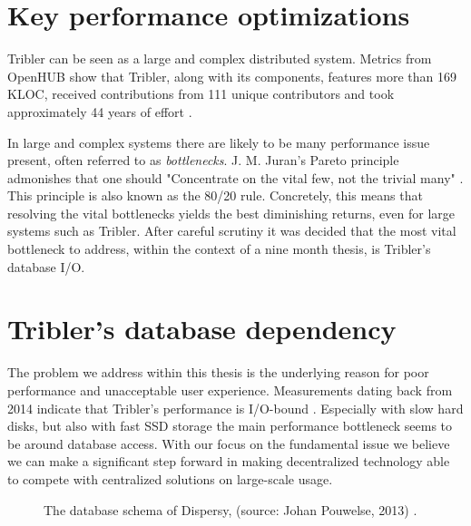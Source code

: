 \section{Key performance optimizations}

Tribler can be seen as a large and complex distributed system.
Metrics from OpenHUB show that Tribler, along with its components, features more than 169 KLOC, received contributions from 111 unique contributors and took approximately 44 years of effort \cite{openhub2016tribler}.

In large and complex systems there are likely to be many performance issue present, often referred to as \emph{bottlenecks}.
J. M. Juran's Pareto principle admonishes that one should "Concentrate on the vital few, not the trivial many" \cite{ammons2004finding}. This principle is also known as the 80/20 rule.
Concretely, this means that resolving the vital bottlenecks yields the best diminishing returns, even for large systems such as Tribler.
After careful scrutiny it was decided that the most vital bottleneck to address, within the context of a nine month thesis, is Tribler's database I/O.

\section{Tribler's database dependency}
\label{sct:triblers_database_dependency}

The problem we address within this thesis is the underlying reason for poor performance and unacceptable user experience. 
Measurements dating back from 2014 indicate that Tribler's performance is I/O-bound \cite{pouwelse2014reduce}.
Especially with slow hard disks, but also with fast SSD storage the main performance bottleneck seems to be around database access.
With our focus on the fundamental issue we believe we can make a significant step forward in making decentralized technology able to compete with centralized solutions on large-scale usage.

\begin{figure}[!h]
	\caption{The database schema of Dispersy, (source: Johan Pouwelse, 2013) \cite{pouwelse2013documentation}.}
	\label{fig:dispersy_database_schema}
\end{figure}

